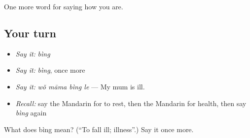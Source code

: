 \begin{grammarlens}[title={What you've built}]
One more word for saying how you are.
\end{grammarlens}

\subsection*{Your turn}
\begin{itemize}
\raggedright
  \item \emph{Say it:} \emph{bìng}
  \item \emph{Say it:} \emph{bìng}, once more
  \item \emph{Say it:} \emph{wǒ māma bìng le} — My mum is ill.
  \item \emph{Recall:} say the Mandarin for to rest, then the Mandarin for health, then say \emph{bìng} again
\end{itemize}

\begin{tcolorbox}[breakable,colback=teal!4,colframe=teal!35!black,title={Before you move on}]
What does bìng mean? (\textquotedblleft{}To fall ill; illness\textquotedblright{}.) Say it once more.
\end{tcolorbox}
